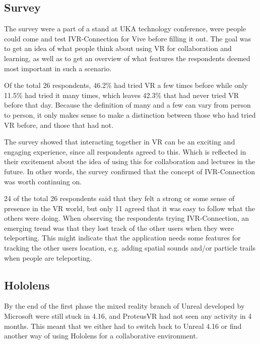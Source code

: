         \subsection{Survey} %
        The survey were a part of a stand at UKA technology conference, were people could come and test IVR-Connection for Vive before filling it out. The goal was to get an idea of what people think about using VR for collaboration and learning, as well as to get an overview of what features the respondents deemed most important in such a scenario.
        
        Of the total 26 respondents, 46.2\% had tried VR a few times before while only 11.5\% had tried it many times, which leaves 42.3\% that had never tried VR before that day. Because the definition of many and a few can vary from person to person, it only makes sense to make a distinction between those who had tried VR before, and those that had not.
        
        The survey showed that interacting together in VR can be an exciting and engaging experience, since all respondents agreed to this. Which is reflected in their excitement about the idea of using this for collaboration and lectures in the future. In other words, the survey confirmed that the concept of IVR-Connection was worth continuing on.
        
        24 of the total 26 respondents said that they felt a strong or some sense of presence in the VR world, but only 11 agreed that it was easy to follow what the others were doing. When observing the respondents trying IVR-Connection, an emerging trend was that they lost track of the other users when they were teleporting. This might indicate that the application needs some features for tracking the other users location, e.g. adding spatial sounds and/or particle trails when people are teleporting.
        
        
        \subsection{Hololens} %
        By the end of the first phase the mixed reality branch of Unreal developed by Microsoft were still stuck in 4.16, and ProteusVR had not seen any activity in 4 months. This meant that we either had to switch back to Unreal 4.16 or find another way of using Hololens for a collaborative environment.
        
